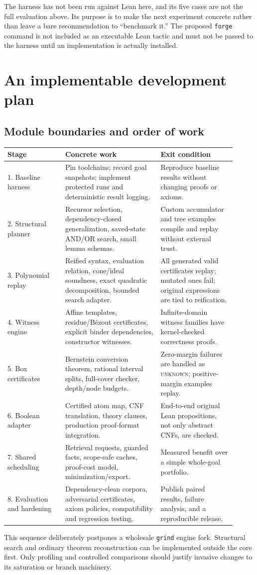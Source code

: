 \documentclass[11pt,letterpaper]{article}
\newcommand{\code}[1]{\texttt{#1}}
\newcommand{\Unknown}{\textsc{unknown}}
\theoremstyle{definition}\newtheorem{definition}[theorem]{Definition}
\theoremstyle{remark}\newtheorem{remark}[theorem]{Remark}
\begin{document}
The harness has not been run against Lean here, and its five cases are not the full evaluation above. Its purpose is to make the next experiment concrete rather than leave a bare recommendation to ``benchmark it.'' The proposed \code{forge} command is not included as an executable Lean tactic and must not be passed to the harness until an implementation is actually installed.

\section{An implementable development plan}
\subsection{Module boundaries and order of work}
\begin{longtable}{P{0.23\linewidth}P{0.38\linewidth}P{0.30\linewidth}}
\toprule
Stage & Concrete work & Exit condition \\
\midrule{}. Baseline harness & Pin toolchains; record goal snapshots; implement protected runs and deterministic result logging. & Reproduce baseline results without changing proofs or axioms. \\
2. Structural planner & Recursor selection, dependency-closed generalization, saved-state AND/OR search, small lemma schemas. & Custom accumulator and tree examples compile and replay without external trust. \\
3. Polynomial replay & Reified syntax, evaluation relation, cone/ideal soundness, exact quadratic decomposition, bounded search adapter. & All generated valid certificates replay; mutated ones fail; original expressions are tied to reification. \\
4. Witness engine & Affine templates, residue/B\'ezout certificates, explicit binder dependencies, constructor witnesses. & Infinite-domain witness families have kernel-checked correctness proofs. \\
5. Box certificates & Bernstein conversion theorem, rational interval splits, full-cover checker, depth/node budgets. & Zero-margin failures are handled as \Unknown; positive-margin examples replay. \\
6. Boolean adapter & Certified atom map, CNF translation, theory clauses, production proof-format integration. & End-to-end original Lean propositions, not only abstract CNFs, are checked. \\
7. Shared scheduling & Retrieval requests, guarded facts, scope-safe caches, proof-cost model, minimization/export. & Measured benefit over a simple whole-goal portfolio. \\
8. Evaluation and hardening & Dependency-clean corpora, adversarial certificates, axiom policies, compatibility and regression testing. & Publish paired results, failure analysis, and a reproducible release. \\
\bottomrule
\end{longtable}
This sequence deliberately postpones a wholesale \code{grind} engine fork. Structural search and ordinary theorem reconstruction can be implemented outside the core first. Only profiling and controlled comparisons should justify invasive changes to its saturation or branch machinery.
\end{document}
